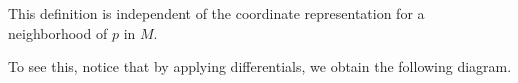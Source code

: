 \documentclass[10pt]{mypackage}
\renewcommand*{\mathbb}[1]{\varmathbb{#1}}
\begin{document}
\begin{remark}
  This definition is independent of the coordinate representation for a neighborhood of $p$ in $M$.
  \begin{center}
  \end{center}
  To see this, notice that by applying differentials, we obtain the following diagram.


\end{remark}
\end{document}
